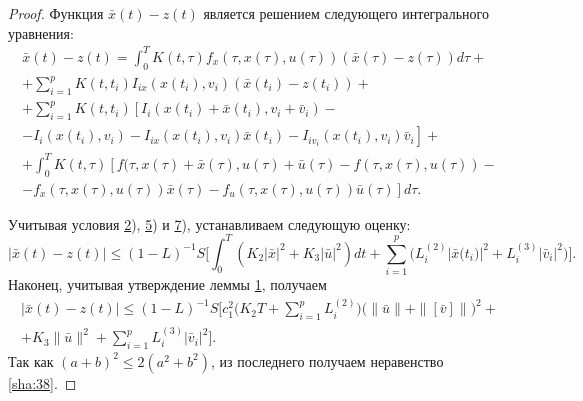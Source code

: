 \begin{proof} Функция $\bar{x}(t)-z(t)$ является решением следующего интегрального уравнения:
\begin{multline}
\bar{x}(t)-z(t)=\int_{0}^{T}K(t,\tau)f_{x}(\tau,x(\tau),u(\tau))(\bar{x}(\tau)-z(\tau))d\tau +
\\
+\sum_{i=1}^{p}K(t,t_{i})I_{ix}(x(t_{i}),v_{i})(\bar{x}(t_{i})-z(t_{i}))+ 
\\
+\sum_{i=1}^{p}K(t,t_{i})\left[I_{i}(x(t_{i})+\bar{x}(t_{i}),v_{i}+\bar{v}_{i})-\right.
\\
\left.-I_{i}(x(t_{i}),v_{i})-I_{ix}(x(t_{i}),v_{i})\bar{x}(t_{i})-I_{iv_{i}}(x(t_{i}),v_{i})\bar{v}_{i}\right]+
\\ 
+\int _{0}^{T}K(t,\tau)\left[f(\tau,x(\tau)+\bar{x}(\tau),u(\tau)+\bar{u}(\tau)-f(\tau,x(\tau),u(\tau))\right.  - 
\\
\left. -f_{x}(\tau,x(\tau),u(\tau))\bar{x}(\tau)-f_{u}(\tau,x(\tau),u(\tau))\bar{u}(\tau)\right]d\tau.
\label{sha:29}
\end{multline}

\pagebreak

\noindent
Учитывая условия \hyperlink{sha:2)}{2}), \hyperlink{sha:5)}{5}) и \hyperlink{sha:7)}{7}), устанавливаем следующую оценку:
\begin{equation}
\label{sha;40}
|\bar{x}(t)-z(t)|\le(1-L)^{-1}S\biggl[\int_{0}^{T}(K_{2}|\bar{x}|^{2}+K_{3}|\bar{u}|^{2})dt+
\sum_{i=1}^{p}(L_{i}^{(2)}|\bar{x}\bigl(t_{i})|^{2}+L_{i}^{(3)}|\bar{v}_{i}|^{2}\bigr)  \biggr].
\end{equation} 
Наконец, учитывая утверждение леммы \hyperlink{sha:lemma:1)}{1}, получаем 
\begin{multline}
\label{sha:41}
|\bar{x}(t)-z(t)|\le(1-L)^{-1}S 
\biggl[c_{1}^{2}\biggl(K_{2}T+\sum_{i=1}^{p}L_{i}^{(2)}\biggr)\bigl(\|\bar{u}\|+\|[\bar{v}]\|\bigr)^{2}+
\\
+K_{3}\|\bar{u}\|^{2}+\sum_{i=1}^{p}L_{i}^{(3)}|\bar{v}_{i}|^{2}\biggr].
\end{multline} 
Так как $(a+b)^{2}\le 2(a^{2}+b^{2})$, из последнего получаем неравенство \eqref{sha:38}.
\end{proof}

